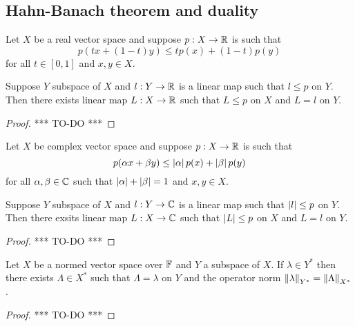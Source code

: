 \documentclass[a4paper]{article}
\begin{document}
\subsection{Hahn-Banach theorem and duality}

\begin{thm}
Let $X$ be a real vector space and suppose $p: X \to \mathbb{R}$ 
is such that 
\[
p(tx + (1-t)y) \leq t p(x) + (1 - t) p (y)
\]
for all $t \in [0,1]$ and $x, y \in X$. 

Suppose $Y$ subspace of $X$ and $l: Y \to \mathbb{R}$ is a linear map 
such that $l \leq p$ on $Y$. Then there exists linear map $L: 
X \to \mathbb{R}$ such that $L \leq p$ on $X$ and $L = l$ on $Y$.
\end{thm}

\begin{proof}
  
*** TO-DO ***

\end{proof}

\begin{thm}
Let $X$ be complex vector space and suppose $p: X \to \mathbb{R}$ 
is such that 
\[
p(\alpha x + \beta y) \leq \left\lvert \alpha\right\rvert p(x) + \left\lvert \beta\right\rvert p(y)
\]
for all $\alpha, \beta \in \mathbb{C}$ such that $\left\lvert \alpha\right\rvert + 
\left\lvert \beta\right\rvert=1$ and $x, y \in X$.

Suppose $Y$ subspace of $X$ and $l: Y \to \mathbb{C}$ is a linear map 
such that $\left\lvert l\right\rvert \leq p$ on $Y$. Then there exsits linear map 
$L: X \to \mathbb{C}$ such that $\left\lvert L\right\rvert \leq p$ on $X$ and  
$L = l$ on $Y$.
\end{thm}

\begin{proof}

*** TO-DO ***

\end{proof}

\begin{thm}
Let $X$ be a normed vector space over $\mathbb{F}$ and $Y$ a subspace 
of $X$. If $\lambda \in Y^*$ then there exists 
$\Lambda \in X^*$ such that $\Lambda = \lambda$ on $Y$ and 
the operator norm 
$\left\lVert \lambda\right\rVert_{Y^*} = \left\lVert \Lambda\right\rVert_{X^*}$.
\end{thm}

\begin{proof}
  
*** TO-DO ***

\end{proof}
\end{document}
